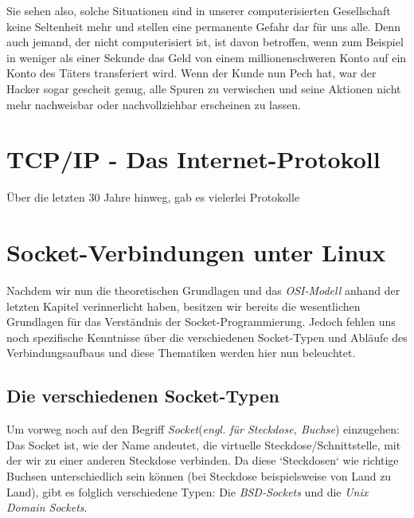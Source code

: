 \documentclass[b5paper,10pt,dvips,fleqn,titlepage,twoside]{book}
\begin{document}
Sie sehen also, solche Situationen sind in unserer computerisierten Gesellschaft keine Seltenheit mehr und stellen eine permanente Gefahr dar für uns alle. Denn auch jemand, der nicht computerisiert ist, ist davon betroffen, wenn zum Beispiel in weniger als einer Sekunde das Geld von einem millionenschweren Konto auf ein Konto des Täters transferiert wird. Wenn der Kunde nun Pech hat, war der Hacker sogar gescheit genug, alle Spuren zu verwischen und seine Aktionen nicht mehr nachweisbar oder nachvollziehbar erscheinen zu lassen.
\newpage
\chapter{TCP/IP - Das Internet-Protokoll}
Über die letzten 30 Jahre hinweg, gab es vielerlei Protokolle
\chapter{Socket-Verbindungen unter Linux}
Nachdem wir nun die theoretischen Grundlagen und das \emph{OSI-Modell} anhand der letzten Kapitel verinnerlicht haben, besitzen wir bereits die wesentlichen Grundlagen für das Verständnis der Socket-Programmierung.
Jedoch fehlen uns noch spezifische Kenntnisse über die verschiedenen Socket-Typen und Abläufe des Verbindungsaufbaus und diese Thematiken werden hier nun beleuchtet.
\section{Die verschiedenen Socket-Typen}
Um vorweg noch auf den Begriff \emph{Socket}(\textit{engl. für Steckdose, Buchse}) einzugehen: \\
Das Socket ist, wie der Name andeutet, die virtuelle Steckdose/Schnittstelle, mit der wir zu einer anderen Steckdose verbinden. Da diese `Steckdosen` wie richtige Buchsen unterschiedlich sein können (bei Steckdose beispielsweise von Land zu Land), gibt es folglich verschiedene Typen: Die \emph{BSD-Sockets} und die \emph{Unix Domain Sockets}.
\end{document}

